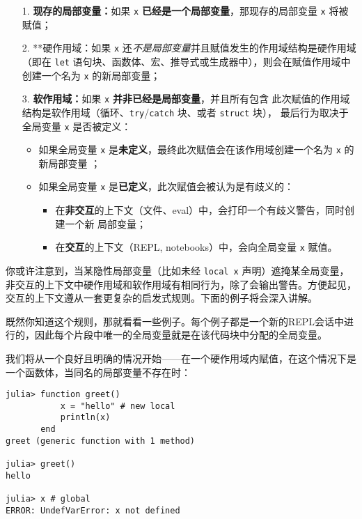 \begin{itemize}
\item[1. ] \textbf{现存的局部变量：}如果 \texttt{x} \textbf{已经是一个局部变量}，那现存的局部变量 \texttt{x} 将被 赋值；


\item[2. ] **硬作用域：如果 \texttt{x} 还\emph{不是局部变量}并且赋值发生的作用域结构是硬作用域（即在 \texttt{let} 语句块、函数体、宏、推导式或生成器中），则会在赋值作用域中创建一个名为 \texttt{x} 的新局部变量；


\item[3. ] \textbf{软作用域：}如果 \texttt{x} \textbf{并非已经是局部变量}，并且所有包含 此次赋值的作用域结构是软作用域（循环、\texttt{try}/\texttt{catch} 块、或者 \texttt{struct} 块）， 最后行为取决于全局变量 \texttt{x} 是否被定义：

\begin{itemize}
\item 如果全局变量 \texttt{x} 是\textbf{未定义}，最终此次赋值会在该作用域创建一个名为 \texttt{x} 的新局部变量 ；


\item 如果全局变量 \texttt{x} 是\textbf{已定义}，此次赋值会被认为是有歧义的：

\begin{itemize}
\item 在\textbf{非交互}的上下文（文件、eval）中，会打印一个有歧义警告，同时创建一个新 局部变量；


\item 在\textbf{交互}的上下文（REPL, notebooks）中，会向全局变量 \texttt{x} 赋值。

\end{itemize}
\end{itemize}
\end{itemize}


你或许注意到，当某隐性局部变量（比如未经 \texttt{local x} 声明）遮掩某全局变量，非交互的上下文中硬作用域和软作用域有相同行为，除了会输出警告。方便起见，交互的上下文遵从一套更复杂的启发式规则。下面的例子将会深入讲解。



既然你知道这个规则，那就看看一些例子。每个例子都是一个新的REPL会话中进行的，因此每个片段中唯一的全局变量就是在该代码块中分配的全局变量。



我们将从一个良好且明确的情况开始——在一个硬作用域内赋值，在这个情况下是一个函数体，当同名的局部变量不存在时：




\begin{verbatim}
julia> function greet()
           x = "hello" # new local
           println(x)
       end
greet (generic function with 1 method)

julia> greet()
hello

julia> x # global
ERROR: UndefVarError: x not defined
\end{verbatim}



